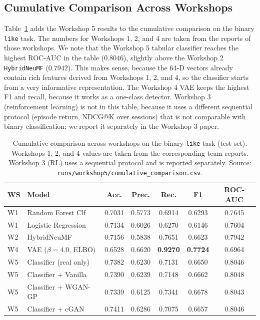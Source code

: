 \documentclass[10pt,twocolumn]{article}
\begin{document}
\subsection{Cumulative Comparison Across Workshops}

Table~\ref{tab:cumulative} adds the Workshop 5 results to the cumulative comparison on the
binary \texttt{like} task. The numbers for Workshops 1, 2, and 4 are taken from the reports of
those workshops. We note that the Workshop 5 tabular classifier reaches the highest ROC-AUC in
the table ($0.8046$), slightly above the Workshop 2 \texttt{HybridNeuMF} ($0.7942$). This makes
sense, because the 64-D vectors already contain rich features derived from Workshops 1, 2, and
4, so the classifier starts from a very informative representation. The Workshop 4 VAE keeps the
highest F1 and recall, because it works as a one-class detector. Workshop 3 (reinforcement
learning) is not in this table, because it uses a different sequential protocol (episode return,
NDCG@K over sessions) that is not comparable with binary classification; we report it separately
in the Workshop 3 paper.

\begin{table}[t]
\centering
\caption{Cumulative comparison across workshops on the binary \texttt{like} task (test set).
Workshops 1, 2, and 4 values are taken from the corresponding team reports. Workshop 3 (RL) uses
a sequential protocol and is reported separately. Source:
\texttt{runs/workshop5/cumulative\_comparison.csv}.}
\label{tab:cumulative}
\small
\begin{tabular}{llccccc}
\toprule
WS & Model & Acc. & Prec. & Rec. & F1 & ROC-AUC \\
\midrule
W1 & Random Forest Clf            & 0.7031 & 0.5773 & 0.6914 & 0.6293 & 0.7645 \\
W1 & Logistic Regression          & 0.7134 & 0.6026 & 0.6270 & 0.6146 & 0.7604 \\
W2 & HybridNeuMF                  & 0.7156 & 0.5838 & 0.7651 & 0.6623 & 0.7942 \\
W4 & VAE ($\beta=4.0$, ELBO)      & 0.6528 & 0.6620 & \textbf{0.9270} & \textbf{0.7724} & 0.6964 \\
W5 & Classifier (real only)       & 0.7382 & 0.6230 & 0.7131 & 0.6650 & 0.8046 \\
W5 & Classifier + Vanilla         & 0.7390 & 0.6239 & 0.7148 & 0.6662 & 0.8048 \\
W5 & Classifier + WGAN-GP         & 0.7339 & 0.6125 & 0.7341 & 0.6678 & 0.8043 \\
W5 & Classifier + cGAN            & 0.7411 & 0.6286 & 0.7075 & 0.6657 & 0.8046 \\
\bottomrule
\end{tabular}
\end{table}
\end{document}
